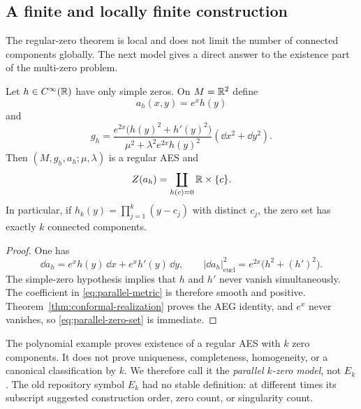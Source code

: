 \subsection{A finite and locally finite construction}

The regular-zero theorem is local and does not limit the number of connected
components globally.  The next model gives a direct answer to the existence part
of the multi-zero problem.

\begin{theorem}
\label{thm:parallel-multi-zero}
Let $h\in C^\infty(\mathbb{R})$ have only simple zeros.  On $M=\mathbb{R}^2$ define
\begin{equation}
 a_h(x,y)=e^x h(y)
 \label{eq:parallel-assignment}
\end{equation}
and
\begin{equation}
 g_h=
 \frac{e^{2x}\bigl(h(y)^2+h'(y)^2\bigr)}
      {\mu^2+\lambda^2e^{2x}h(y)^2}
 (\dd x^2+\dd y^2).
 \label{eq:parallel-metric}
\end{equation}
Then $(M,g_h,a_h;\mu,\lambda)$ is a regular AES and
\begin{equation}
 Z(a_h)=\coprod_{h(c)=0}\mathbb{R}\times\{c\}.
 \label{eq:parallel-zero-set}
\end{equation}
In particular, if
$h_k(y)=\prod_{j=1}^k(y-c_j)$ with distinct $c_j$, the zero set has exactly
$k$ connected components.
\end{theorem}

\begin{proof}
One has
\[
 \dd a_h=e^x h(y)\,\dd x+e^x h'(y)\,\dd y,
 \qquad
 |\dd a_h|^2_{\mathrm{eucl}}
 =e^{2x}\bigl(h^2+(h')^2\bigr).
\]
The simple-zero hypothesis implies that $h$ and $h'$ never vanish
simultaneously.  The coefficient in \eqref{eq:parallel-metric} is therefore smooth
and positive.  Theorem~\ref{thm:conformal-realization} proves the AEG identity,
and $e^x$ never vanishes, so \eqref{eq:parallel-zero-set} is immediate.
\end{proof}

\begin{remark}
\label{rem:descriptive-index}
The polynomial example proves existence of a regular AES with $k$ zero components.
It does not prove uniqueness, completeness, homogeneity, or a canonical
classification by $k$.  We therefore call it the \emph{parallel $k$-zero model},
not $E_k$.  The old repository symbol $E_k$ had no stable definition: at different
times its subscript suggested construction order, zero count, or singularity count.
\end{remark}

